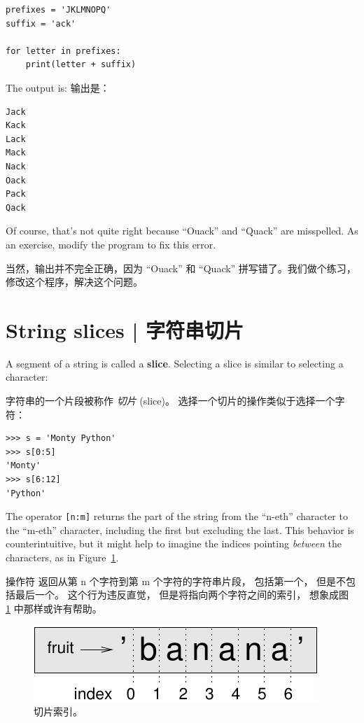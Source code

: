 \begin{lstlisting}
prefixes = 'JKLMNOPQ'
suffix = 'ack'

for letter in prefixes:
    print(letter + suffix)
\end{lstlisting}

%
The output is:
输出是：

\begin{lstlisting}
Jack
Kack
Lack
Mack
Nack
Oack
Pack
Qack
\end{lstlisting}

%
Of course, that's not quite right because ``Ouack'' and ``Quack'' are
misspelled.  As an exercise, modify the program to fix this error.

当然，输出并不完全正确，因为 ``Ouack'' 和 ``Quack'' 拼写错了。我们做个练习， 修改这个程序，解决这个问题。



\section{String slices  |  字符串切片}
\label{slice}
  
 

A segment of a string is called a {\bf slice}.  Selecting a slice is
similar to selecting a character:

字符串的一个片段被称作 {\em 切片} (slice)。 选择一个切片的操作类似于选择一个字符：

\begin{lstlisting}
>>> s = 'Monty Python'
>>> s[0:5]
'Monty'
>>> s[6:12]
'Python'
\end{lstlisting}

%
The operator {\tt [n:m]} returns the part of the string from the
``n-eth'' character to the ``m-eth'' character, including the first but
excluding the last.  This behavior is counterintuitive, but it might
help to imagine the indices pointing {\em between} the
characters, as in Figure~\ref{fig.banana}.

操作符 \li{[n:m]} 返回从第 n 个字符到第 m 个字符的字符串片段， 包括第一个， 但是不包括最后一个。 这个行为违反直觉， 但是将指向两个字符之间的索引， 想象成图~ \ref{fig.banana} 中那样或许有帮助。

\begin{figure}
\centerline
{\includegraphics[scale=0.8]{../source/figs/banana.pdf}}
\caption{切片索引。}
\label{fig.banana}
\end{figure}

